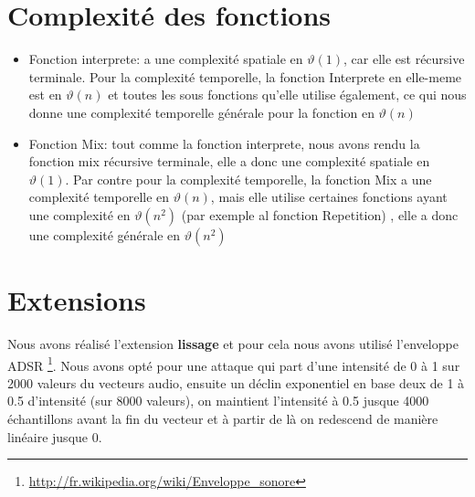 \documentclass[a4paper,12pt]{report}
\begin{document}
\section*{Complexité des fonctions}
\begin{itemize}


\item Fonction interprete: a une complexité spatiale en $\vartheta(1)$, car elle est récursive terminale.
Pour la complexité temporelle, la fonction Interprete en elle-meme est en  $\vartheta(n)$ et toutes les sous fonctions qu'elle utilise également, ce qui nous donne une complexité temporelle  générale pour la fonction en  $\vartheta(n)$
\item Fonction Mix: tout comme la fonction interprete, nous avons rendu la fonction mix récursive terminale, elle a donc une complexité spatiale en  $\vartheta(1)$. Par contre pour la complexité temporelle, la fonction Mix a une complexité temporelle en  $\vartheta(n)$, mais elle utilise certaines fonctions ayant une complexité en  $\vartheta(n^2)$ (par exemple al fonction Repetition) , elle a donc une complexité générale en  $\vartheta(n^2)$

\end{itemize} 


\section*{Extensions}
Nous avons réalisé l'extension {\large \textbf{lissage}} et pour cela nous avons utilisé l'enveloppe ADSR \footnote{\url{http://fr.wikipedia.org/wiki/Enveloppe_sonore}}. Nous avons opté pour une attaque qui part d'une intensité de 0 à 1 sur 2000 valeurs du vecteurs audio, ensuite un déclin exponentiel en base deux de 1 à 0.5 d'intensité (sur 8000 valeurs), on maintient l'intensité à 0.5 jusque 4000 échantillons avant la fin du vecteur et à partir de là on redescend de manière linéaire jusque 0.
\end{document}
